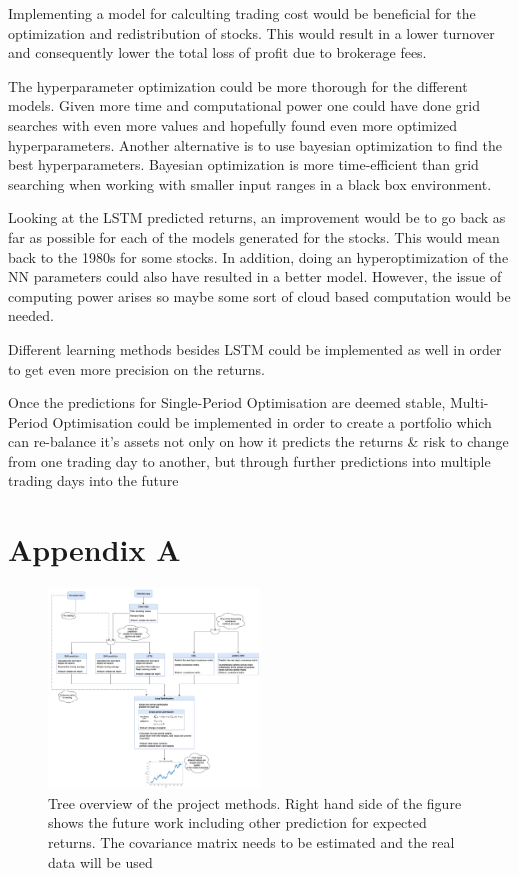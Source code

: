 \documentclass[final]{LTHtwocol} %
\begin{document}
Implementing a model for calculting trading cost would be beneficial for the optimization and redistribution of stocks. This would result in a lower turnover and consequently lower the total loss of profit due to brokerage fees.

The hyperparameter optimization could be more thorough for the different models. Given more time and computational power one could have done grid searches with even more values and hopefully found even more optimized hyperparameters. Another alternative is to use bayesian optimization to find the best hyperparameters. Bayesian optimization is more time-efficient than grid searching when working with smaller input ranges in a black box environment.\cite{ref:Bayesian}

Looking at the LSTM predicted returns, an improvement would be to go back as far as possible for each of the models generated for the stocks. This would mean back to the 1980s for some stocks. In addition, doing an hyperoptimization of the NN parameters could also have resulted in a better model. However, the issue of computing power arises so maybe some sort of cloud based computation would be needed.

Different learning methods besides LSTM could be implemented as well in order to get even more precision on the returns. 

Once the predictions for Single-Period Optimisation are deemed stable, Multi-Period Optimisation could be implemented in order to create a portfolio which can re-balance it's assets not only on how it predicts the returns \& risk to change from one trading day to another, but through further predictions into multiple trading days into the future


\section{Appendix A}
\begin{figure}[h]
\centering
	\includegraphics[width=0.5\textwidth]{Pics/Mod_overview_future.png}
	\begin{centering}
	\caption{Tree overview of the project methods. Right hand side of the figure shows the future work including other prediction for expected returns. The covariance matrix needs to be estimated and the real data will be used}
	\label{fig:tree_future}
	\end{centering}
\end{figure}







\printbibliography [b]
\end{document}
